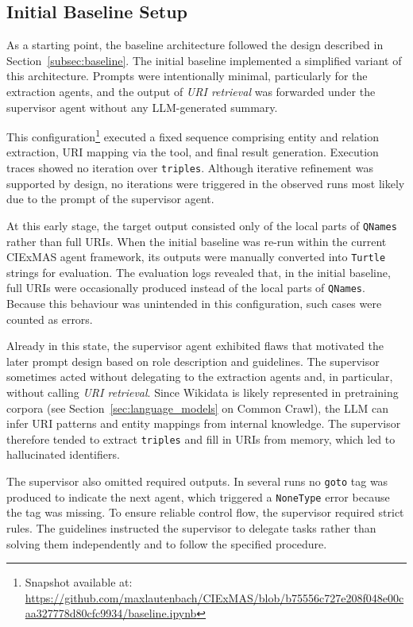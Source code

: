 \documentclass[a4paper,oneside,bibliography=totoc]{scrbook}
\begin{document}
\subsection{Initial Baseline Setup}
\label{subsec:initial_baseline_setup}

As a starting point, the baseline architecture followed the design described in Section~\ref{subsec:baseline}. The initial baseline implemented a simplified variant of this architecture. Prompts were intentionally minimal, particularly for the extraction agents, and the output of \textit{\ac{URI} retrieval} was forwarded under the supervisor agent without any \ac{LLM}-generated summary.

This configuration\footnote{Snapshot available at: \url{https://github.com/maxlautenbach/CIExMAS/blob/b75556c727e208f048e00caa327778d80cfc9934/baseline.ipynb}} executed a fixed sequence comprising entity and relation extraction, \ac{URI} mapping via the tool, and final result generation. Execution traces showed no iteration over \texttt{triples}. Although iterative refinement was supported by design, no iterations were triggered in the observed runs most likely due to the prompt of the supervisor agent.

At this early stage, the target output consisted only of the local parts of \texttt{QNames} rather than full \acp{URI}. When the initial baseline was re-run within the current CIExMAS agent framework, its outputs were manually converted into \texttt{Turtle} strings for evaluation. The evaluation logs revealed that, in the initial baseline, full \acp{URI} were occasionally produced instead of the local parts of \texttt{QNames}. Because this behaviour was unintended in this configuration, such cases were counted as errors.

Already in this state, the supervisor agent exhibited flaws that motivated the later prompt design based on role description and guidelines. The supervisor sometimes acted without delegating to the extraction agents and, in particular, without calling \textit{\ac{URI} retrieval}. Since Wikidata is likely represented in pretraining corpora (see Section~\ref{sec:language_models} on Common Crawl), the \ac{LLM} can infer \ac{URI} patterns and entity mappings from internal knowledge. The supervisor therefore tended to extract \texttt{triples} and fill in \acp{URI} from memory, which led to hallucinated identifiers.

The supervisor also omitted required outputs. In several runs no \texttt{goto} tag was produced to indicate the next agent, which triggered a \texttt{NoneType} error because the tag was missing. To ensure reliable control flow, the supervisor required strict rules. The guidelines instructed the supervisor to delegate tasks rather than solving them independently and to follow the specified procedure.
\end{document}
